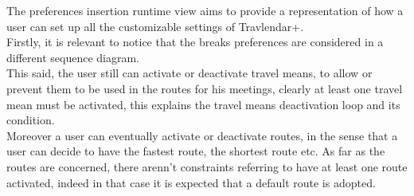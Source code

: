 The preferences insertion runtime view aims to provide a representation of how a user can set up all the customizable settings of Travlendar+.\\ 
Firstly, it is relevant to notice that the breaks preferences are considered in a different sequence diagram. \\ 
This said, the user still can activate or deactivate travel means, to allow or prevent them to be used in the routes for his meetings, clearly at least one travel mean must be activated, this explains the travel means deactivation loop and its condition. \\
Moreover a user can eventually activate or deactivate routes, in the sense that a user can decide to have the fastest route, the shortest route etc. As far as the routes are concerned, there arenn't constraints referring to have at least one route activated, indeed in that case it is expected that a default route is adopted. 